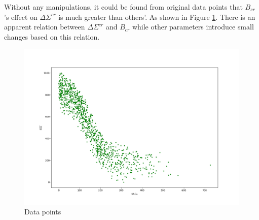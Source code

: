 Without any manipulations, it could be found from original data points
that $B_{cr}$'s effect on $\Delta\Sigma^{cr}$ is much greater than others'.
As shown in Figure \ref{fig:datapoints}.
There is an apparent relation between $\Delta\Sigma^{cr}$ and $B_{cr}$ while
other parameters introduce small changes based on this relation.
\begin{figure}[!htb]
    \centering\includegraphics[width=0.5\linewidth]{Figs/data.png}
    \caption{Data points}
    \label{fig:datapoints}
\end{figure}

